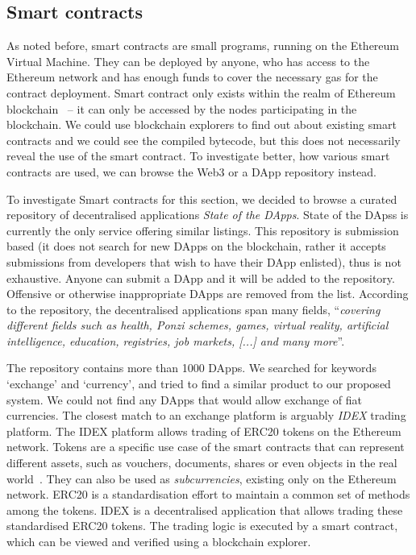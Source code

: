 \subsection{Smart contracts}

As noted before, smart contracts are small programs, running on the Ethereum Virtual Machine. They can be deployed by anyone, who has access to the Ethereum network and has enough funds to cover the necessary gas for the contract deployment. Smart contract only exists within the realm of Ethereum blockchain~\cite{JohnWeldon2016BuildingContract} -- it can only be accessed by the nodes participating in the blockchain. We could use blockchain explorers to find out about existing smart contracts and we could see the compiled bytecode, but this does not necessarily reveal the use of the smart contract. To investigate better, how various smart contracts are used, we can browse the Web3 or a DApp repository instead.

To investigate Smart contracts for this section, we decided to browse a curated repository of decentralised applications \textit{State of the DApps}. State of the DApss is currently the only service offering similar listings. This repository is submission based (it does not search for new DApps on the blockchain, rather it accepts submissions from developers that wish to have their DApp enlisted), thus is not exhaustive. Anyone can submit a DApp and it will be added to the repository. Offensive or otherwise inappropriate DApps are removed from the list. According to the repository, the decentralised applications span many fields, ``\textit{covering different fields such as health, Ponzi schemes, games, virtual reality, artificial intelligence, education, registries, job markets, [...] and many more}''\footnotemark. 
% 

The repository contains more than 1000 DApps. We searched for keywords `exchange' and `currency', and tried to find a similar product to our proposed system. We could not find any DApps that would allow exchange of fiat currencies. The closest match to an exchange platform is arguably \textit{IDEX} trading platform\footnotemark. The IDEX platform allows trading of ERC20 tokens on the Ethereum network. Tokens are a specific use case of the smart contracts that can represent different assets, such as vouchers, documents, shares or even objects in the real world~\cite{NathanReiff2017WhatEthereum}. They can also be used as \textit{subcurrencies}, existing only on the Ethereum network. ERC20 is a standardisation effort to maintain a common set of methods among the tokens.
% 
% 
IDEX is a decentralised application that allows trading these standardised ERC20 tokens. The trading logic is executed by a smart contract, which can be viewed and verified using a blockchain explorer\footnotemark.
% 


